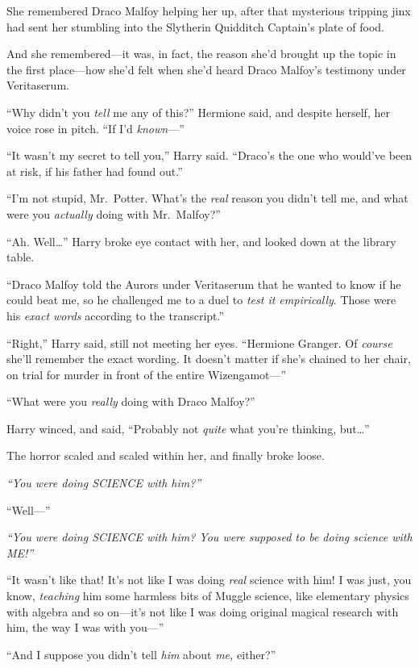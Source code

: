 She remembered Draco Malfoy helping her up, after that mysterious
tripping jinx had sent her stumbling into the Slytherin Quidditch
Captain's plate of food.

And she remembered---it was, in fact, the reason she'd brought up the
topic in the first place---how she'd felt when she'd heard Draco
Malfoy's testimony under Veritaserum.

``Why didn't you \emph{tell} me any of this?'' Hermione said, and
despite herself, her voice rose in pitch. ``If I'd \emph{known}---''

``It wasn't my secret to tell you,'' Harry said. ``Draco's the one who
would've been at risk, if his father had found out.''

``I'm not stupid, Mr.~Potter. What's the \emph{real} reason you didn't
tell me, and what were you \emph{actually} doing with Mr.~Malfoy?''

``Ah. Well\ldots{}'' Harry broke eye contact with her, and looked down
at the library table.

``Draco Malfoy told the Aurors under Veritaserum that he wanted to know
if he could beat me, so he challenged me to a duel to \emph{test it
empirically}. Those were his \emph{exact words} according to the
transcript.''

``Right,'' Harry said, still not meeting her eyes. ``Hermione Granger.
Of \emph{course} she'll remember the exact wording. It doesn't matter if
she's chained to her chair, on trial for murder in front of the entire
Wizengamot---''

``What were you \emph{really} doing with Draco Malfoy?''

Harry winced, and said, ``Probably not \emph{quite} what you're
thinking, but\ldots{}''

The horror scaled and scaled within her, and finally broke loose.

\emph{``You were doing SCIENCE with him?''}

``Well---''

\emph{``You were doing SCIENCE with him? You were supposed to be doing
science with ME!''}

``It wasn't like that! It's not like I was doing \emph{real} science
with him! I was just, you know, \emph{teaching} him some harmless bits
of Muggle science, like elementary physics with algebra and so on---it's
not like I was doing original magical research with him, the way I was
with you---''

``And I suppose you didn't tell \emph{him} about \emph{me,} either?''

